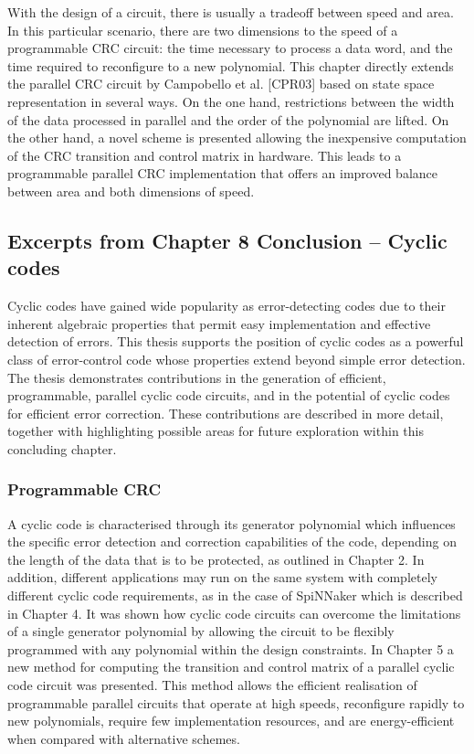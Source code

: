 \documentclass[a4paper, 11pt]{article}
\begin{document}
With the design of a circuit, there is usually a tradeoff between speed and area. In this particular scenario, there are two dimensions to the speed of a programmable CRC circuit: the time necessary to process a data word, and the time required to reconfigure to a new polynomial. This chapter directly extends the parallel CRC circuit by Campobello et al. [CPR03] based on state space representation in several ways. On the one hand, restrictions between the width of the data processed in parallel and the order of the polynomial are lifted. On the other hand, a novel scheme is presented allowing the inexpensive computation of the CRC transition and control matrix in hardware. This leads to a programmable parallel CRC implementation that offers an improved balance between area and both dimensions of speed.

\newpage
\subsection{Excerpts from Chapter 8 Conclusion -- Cyclic codes}
Cyclic codes have gained wide popularity as error-detecting codes due to their inherent algebraic properties that permit easy implementation and effective detection of errors. This thesis supports the position of cyclic codes as a powerful class of error-control code whose properties extend beyond simple error detection. The thesis demonstrates contributions in the generation of efficient, programmable, parallel cyclic code circuits, and in the potential of cyclic codes for efficient error correction. These contributions are described in more detail, together with highlighting possible areas for future exploration within this concluding chapter.

\subsubsection{Programmable CRC}
A cyclic code is characterised through its generator polynomial which influences the specific error detection and correction capabilities of the code, depending on the length of the data that is to be protected, as outlined in Chapter 2. In addition, different applications may run on the same system with completely different cyclic code requirements, as in the case of SpiNNaker which is described in Chapter 4. It was shown how cyclic code circuits can overcome the limitations of a single generator polynomial by allowing the circuit to be flexibly programmed with any polynomial within the design constraints. In Chapter 5 a new method for computing the transition and control matrix of a parallel cyclic code circuit was presented. This method allows the efficient realisation of programmable parallel circuits that operate at high speeds, reconfigure rapidly to new polynomials, require few implementation resources, and are energy-efficient when compared with alternative schemes.
\end{document}
